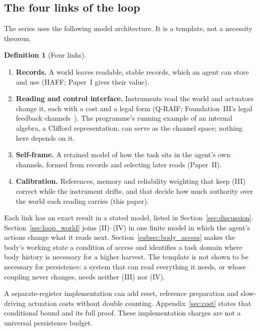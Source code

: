 \documentclass[12pt]{article}
\theoremstyle{definition}
\newtheorem{definition}[theorem]{Definition}
\begin{document}
\subsection{The four links of the loop}
\label{subsec:four_part}

The series uses the following model architecture. It is a template, not a necessity theorem.

\begin{definition}[Four links]
\label{def:four_part_template}
\begin{enumerate}
\item[\textup{(I)}] \textbf{Records.} A world leaves readable, stable records, which an agent can store and use (HAFF; Paper~I gives their value).
\item[\textup{(II)}] \textbf{Reading and control interface.} Instruments read the world and actuators change it, each with a cost and a legal form (Q-RAIF; Foundation~III's legal feedback channels~\cite{Liu2026FIII}). The programme's running example of an internal algebra, a Clifford representation, can serve as the channel space; nothing here depends on it.
\item[\textup{(III)}] \textbf{Self-frame.} A retained model of how the task sits in the agent's own channels, formed from records and selecting later reads (Paper~II).
\item[\textup{(IV)}] \textbf{Calibration.} References, memory and reliability weighting that keep (III) correct while the instrument drifts, and that decide how much authority over the world each reading carries (this paper).
\end{enumerate}
\end{definition}

Each link has an exact result in a stated model, listed in Section~\ref{sec:discussion}. Section~\ref{sec:loop_world} joins (II)--(IV) in one finite model in which the agent's actions change what it reads next. Section~\ref{subsec:body_access} makes the body's working state a condition of access and identifies a task domain where body history is necessary for a higher harvest. The template is not shown to be necessary for persistence: a system that can read everything it needs, or whose coupling never changes, needs neither (III) nor (IV).

A separate-register implementation can add reset, reference preparation
and slow-driving actuation costs without double counting.
Appendix~\ref{sec:cost} states that conditional bound and its full proof.
These implementation charges are not a universal persistence budget.
\end{document}
